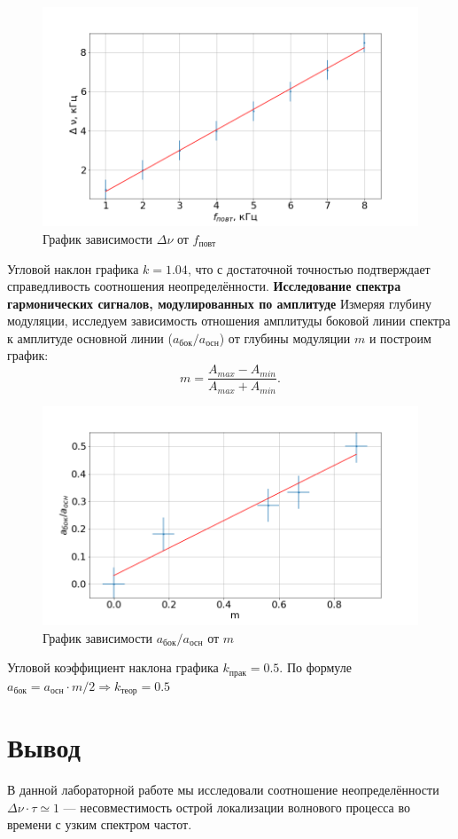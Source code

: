 \documentclass[a4paper, fontsize=14pt]{article}
\begin{document}
\begin{figure}[H]
\center
\includegraphics[scale=0.4]{gra2.png}
\caption{График зависимости $\Delta \nu$ от $f_\text{повт}$}
\end{figure}
Угловой наклон графика $k = 1.04$, что с достаточной точностью подтверждает справедливость соотношения неопределённости.
\textbf{Исследование спектра гармонических сигналов, модулированных по амплитуде}
Измеряя глубину модуляции, исследуем зависимость отношения амплитуды боковой линии спектра к амплитуде основной линии ($a_\text{бок} / a_\text{осн}$) от глубины модуляции $m$ и построим график:
\[
	m = \frac{A_{max} - A_{min}}{A_{max} + A_{min}}.
\]
\begin{figure}[H]
\center
\includegraphics[scale=0.4]{gra3.png}
\caption{График зависимости $a_\text{бок} / a_\text{осн}$ от $m$}
\end{figure}
Угловой коэффициент наклона графика $k_\text{прак} = 0.5$. По формуле $a_\text{бок} = a_\text{осн} \cdot m / 2 \Rightarrow k_\text{теор} = 0.5$
\section*{Вывод}
В данной лабораторной работе мы исследовали соотношение неопределённости $\Delta \nu \cdot \tau \simeq 1$ --- несовместимость острой локализации волнового процесса во времени с узким спектром частот.
\end{document}
